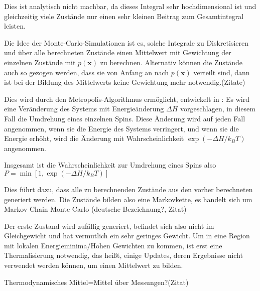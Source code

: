 \documentclass{scrreprt}
\begin{document}
	Dies ist analytisch nicht machbar, da dieses Integral sehr hochdimensional ist und gleichzeitig viele Zustände nur einen sehr kleinen Beitrag zum Gesamtintegral leisten\cite[vgl. ][S. 9]{binderheermann}.
	
	Die Idee der Monte-Carlo-Simulationen ist es, solche Integrale zu Diskretisieren
	und über alle berechneten Zustände einen Mittelwert mit Gewichtung der einzelnen Zustände mit $p(\mathbf{x})$ zu berechnen. Alternativ können die Zustände auch so gezogen werden, dass sie von Anfang an nach $p(\mathbf{x})$ verteilt sind, dann ist bei der Bildung des Mittelwerts keine Gewichtung mehr notwendig.(Zitate) %
	
	Dies wird durch den Metropolis-Algorithmus ermöglicht, entwickelt in \cite{metropolisupdate}:
	Es wird eine Veränderung des Systems mit Energieänderung $\Delta H$ vorgeschlagen, in diesem Fall die Umdrehung eines einzelnen Spins. Diese Änderung wird auf jeden Fall angenommen, wenn sie die Energie des Systems verringert, und wenn sie die Energie erhöht, wird die Änderung mit Wahrscheinlichkeit $\exp(-\Delta H/k_BT)$ angenommen.
	
	Insgesamt ist die Wahrscheinlichkeit zur Umdrehung eines Spins also $P=\min \left[1, \exp(-\Delta H/k_BT)\right]$
	
	Dies führt dazu, dass alle zu berechnenden Zustände aus den vorher berechneten generiert werden. Die Zustände bilden also eine Markovkette, es handelt sich um Markov Chain Monte Carlo (deutsche Bezeichnung?, Zitat)
	
	Der erste Zustand wird zufällig generiert, befindet sich also nicht im Gleichgewicht und hat vermutlich ein sehr geringes Gewicht. Um in eine Region mit lokalen Energieminima/Hohen Gewichten zu kommen, ist erst eine Thermalisierung notwendig, das heißt, einige Updates, deren Ergebnisse nicht verwendet werden können, um einen Mittelwert zu bilden\cite[vgl. ][Abschnitt 3.4]{binderheermann}. %
	
	Thermodynamisches Mittel=Mittel über Messungen?(Zitat)
	
\end{document}

